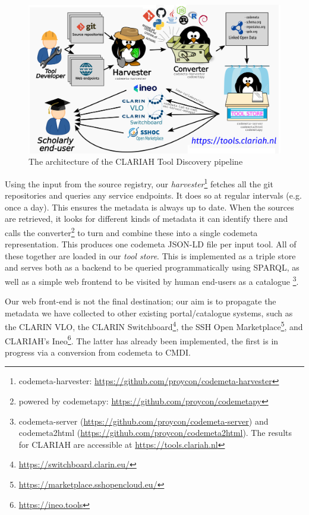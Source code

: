\documentclass[a4paper,11pt]{article}
\begin{document}
\begin{figure}[h]
\begin{center}
\includegraphics[width=14.0cm]{architecture.png}
\caption{The architecture of the CLARIAH Tool Discovery pipeline}
\end{center}
\label{fig:architecture}
\end{figure}

Using the input from the source registry, our
\emph{harvester}\footnote{codemeta-harvester:
\url{https://github.com/proycon/codemeta-harvester}} fetches all the git
repositories and queries any service endpoints. It does so at regular intervals
(e.g. once a day). This ensures the metadata is always up to date. When the
sources are retrieved, it looks for different kinds of metadata it can
identify there and calls the converter\footnote{powered by codemetapy:
\url{https://github.com/proycon/codemetapy}} to turn and combine these into a
single codemeta representation. This produces one codemeta JSON-LD file per
input tool. All of these together are loaded in our \emph{tool store}. This is
implemented as a triple store and serves both as a backend to be queried
programmatically using SPARQL, as well as a simple web frontend to be visited by
human end-users as a catalogue \footnote{codemeta-server
(\url{https://github.com/proycon/codemeta-server}) and codemeta2html
(\url{https://github.com/proycon/codemeta2html}). The results for CLARIAH are
accessible at \url{https://tools.clariah.nl}}.

Our web front-end is not the final destination; our aim is to propagate the
metadata we have collected to other existing portal/catalogue systems, such as
the CLARIN VLO, the CLARIN
Switchboard\footnote{\url{https://switchboard.clarin.eu/}}, the SSH Open
Marketplace\footnote{\url{https://marketplace.sshopencloud.eu/}}, and CLARIAH's
Ineo\footnote{\url{https://ineo.tools}}. The latter has already been
implemented, the first is in progress via a conversion from codemeta to CMDI.
\end{document}
